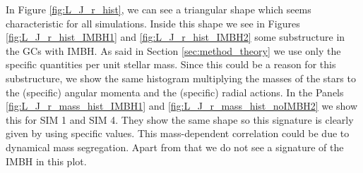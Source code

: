 In Figure \ref{fig:L_J_r_hist}, we can see a triangular shape which seems characteristic for all simulations. Inside this shape we see in Figures \ref{fig:L_J_r_hist_IMBH1} and \ref{fig:L_J_r_hist_IMBH2} some substructure in the \acp{GC} with \ac{IMBH}. As said in Section \ref{sec:method_theory} we use only the specific quantities per unit stellar mass. Since this could be a reason for this substructure, we show the same histogram multiplying the masses of the stars to the (specific) angular momenta and the (specific) radial actions. In the Panels \ref{fig:L_J_r_mass_hist_IMBH1} and \ref{fig:L_J_r_mass_hist_noIMBH2} we show this for SIM 1 and SIM 4. They show the same shape so this signature is clearly given by using specific values. This mass-dependent correlation could be due to dynamical mass segregation. Apart from that we do not see a signature of the \ac{IMBH} in this plot.

